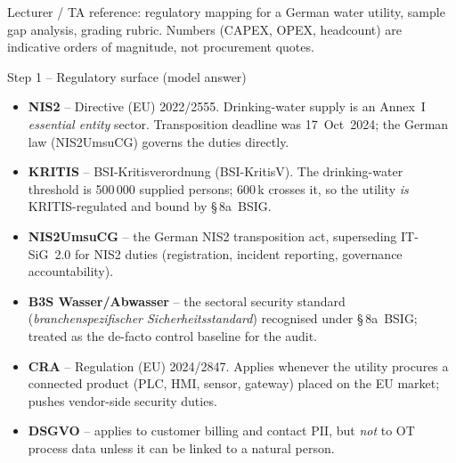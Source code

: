 \documentclass[11pt,a4paper]{article}
\begin{document}
\labheader

\begin{goalbox}
Lecturer / TA reference: regulatory mapping for a German water utility, sample gap analysis, grading rubric. Numbers (CAPEX, OPEX, headcount) are indicative orders of magnitude, not procurement quotes.
\end{goalbox}

\begin{solutionbox}{Step 1 -- Regulatory surface (model answer)}
\begin{itemize}\setlength{\itemsep}{1pt}
  \item \textbf{NIS2} -- Directive (EU) 2022/2555. Drinking-water supply is an Annex~I \emph{essential entity} sector. Transposition deadline was 17~Oct~2024; the German law (NIS2UmsuCG) governs the duties directly.
  \item \textbf{KRITIS} -- BSI-Kritisverordnung (BSI-KritisV). The drinking-water threshold is \mbox{500\,000} supplied persons; 600\,k crosses it, so the utility \emph{is} KRITIS-regulated and bound by \S\,8a~BSIG.
  \item \textbf{NIS2UmsuCG} -- the German NIS2 transposition act, superseding IT-SiG~2.0 for NIS2 duties (registration, incident reporting, governance accountability).
  \item \textbf{B3S Wasser/Abwasser} -- the sectoral security standard (\emph{branchenspezifischer Sicherheitsstandard}) recognised under \S\,8a~BSIG; treated as the de-facto control baseline for the audit.
  \item \textbf{CRA} -- Regulation (EU) 2024/2847. Applies whenever the utility procures a connected product (PLC, HMI, sensor, gateway) placed on the EU market; pushes vendor-side security duties.
  \item \textbf{DSGVO} -- applies to customer billing and contact PII, but \emph{not} to OT process data unless it can be linked to a natural person.
\end{itemize}
\end{solutionbox}
\end{document}
